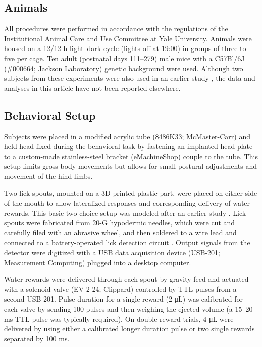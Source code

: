 
\subsection*{Animals}
All procedures were performed in accordance with the regulations of the Institutional Animal Care and Use Committee at Yale University. Animals were housed on a 12/12-h light–dark cycle (lights off at 19:00) in groups of three to five per cage. Ten adult (postnatal days 111–279) male mice with a C57Bl/6J (\#000664; Jackson Laboratory) genetic background were used. Although two subjects from these experiments were also used in an earlier study \citep{siniscalchi2016fast}, the data and analyses in this article have not been reported elsewhere.

\subsection*{Behavioral Setup}
Subjects were placed in a modified acrylic tube (8486K33; McMaster-Carr) and held head-fixed during the behavioral task by fastening an implanted head plate to a custom-made stainless-steel bracket (eMachineShop) couple to the tube. This setup limits gross body movements but allows for small postural adjustments and movement of the hind limbs. 

Two lick spouts, mounted on a 3D-printed plastic part, were placed on either side of the mouth to allow lateralized responses and corresponding delivery of water rewards. This basic two-choice setup was modeled after an earlier study \citep{guo2014flow}. Lick spouts were fabricated from 20-G hypodermic needles, which were cut and carefully filed with an abrasive wheel, and then soldered to a wire lead and connected to a battery-operated lick detection circuit \citep{slotnick2009simple}. Output signals from the detector were digitized with a USB data acquisition device (USB-201; Measurement Computing) plugged into a desktop computer. 

Water rewards were delivered through each spout by gravity-feed and actuated with a solenoid valve (EV-2-24; Clippard) controlled by TTL pulses from a second USB-201. Pulse duration for a single reward (2 \si{\uL}) was calibrated for each valve by sending 100 pulses and then weighing the ejected volume (a 15–20 ms TTL pulse was typically required). On double-reward trials, 4 \si{\uL} were delivered by using either a calibrated longer duration pulse or two single rewards separated by 100 ms. 

